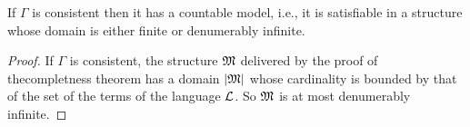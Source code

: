 \documentclass[open-logic-section]{subfiles}
\begin{document}

\begin{thm} 
If $\Gamma$ is consistent then it has a countable model, i.e., it is
satisfiable in a structure whose domain is either finite or
denumerably infinite.
\end{thm}

\begin{proof}
  If $\Gamma$ is consistent, the structure $\mathfrak M$ delivered by
  the proof of thecompletness theorem has a domain $\left| \mathfrak M \right|$ whose
  cardinality is bounded by that of the set of the terms of the
  language $\mathcal L$. So $\mathfrak M$ is at most denumerably infinite.
\end{proof}
\end{document}
